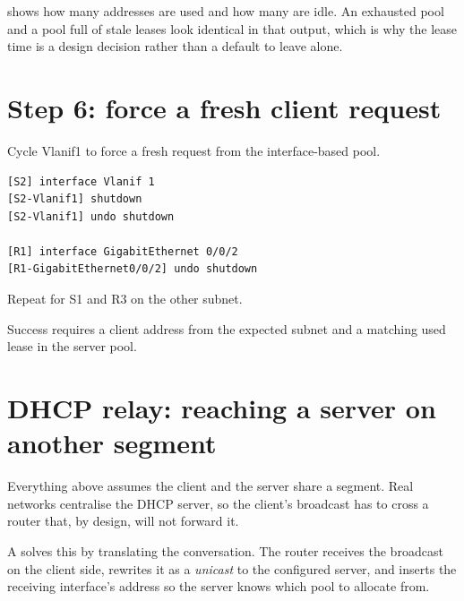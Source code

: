 \begin{keyidea}
 shows how many addresses are used and how many are
idle. An exhausted pool and a pool full of stale leases look identical in
that output, which is why the lease time is a design decision rather than
a default to leave alone.
\end{keyidea}

\section{Step 6: force a fresh client request}
Cycle Vlanif1 to force a fresh request from the interface-based pool.
\begin{lstlisting}[style=utpterminal]
[S2] interface Vlanif 1
[S2-Vlanif1] shutdown
[S2-Vlanif1] undo shutdown

[R1] interface GigabitEthernet 0/0/2
[R1-GigabitEthernet0/0/2] undo shutdown
\end{lstlisting}
Repeat for S1 and R3 on the other subnet.

\begin{verification}
Success requires a client address from the expected subnet and a matching used lease in the server pool.
\end{verification}

\section{DHCP relay: reaching a server on another segment}\label{sec:dhcp-relay}

Everything above assumes the client and the server share a segment. Real networks centralise the DHCP server, so the client's broadcast has to cross a router that, by design, will not forward it.

A  solves this by translating the conversation. The router receives the broadcast on the client side, rewrites it as a \emph{unicast} to the configured server, and inserts the receiving interface's address so the server knows which pool to allocate from.

